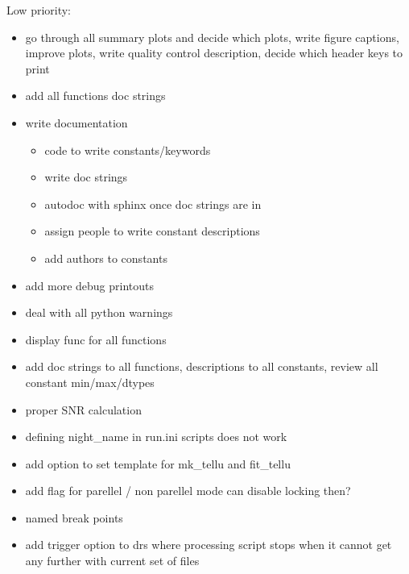 \documentclass[a4paper,10pt,english]{report}
\begin{document}
Low priority:
\begin{itemize}
\item {} 
go through all summary plots and decide which plots, write figure captions, improve plots, write quality control description, decide which header keys to print

\item {} 
add all functions doc strings

\item {} 
write documentation
\begin{itemize}
\item {} 
code to write constants/keywords

\item {} 
write doc strings

\item {} 
autodoc with sphinx once doc strings are in

\item {} 
assign people to write constant descriptions

\item {} 
add authors to constants

\end{itemize}

\item {} 
add more debug printouts

\item {} 
deal with all python warnings

\item {} 
display func for all functions

\item {} 
add doc strings to all functions, descriptions to all constants, review all constant min/max/dtypes

\item {} 
proper SNR calculation

\item {} 
defining night\_name in run.ini scripts does not work

\item {} 
add option to set template for mk\_tellu and fit\_tellu

\item {} 
add flag for parellel / non parellel mode \sphinxhyphen{} can disable locking then?

\item {} 
named break points

\item {} 
add trigger option to drs where processing script stops when it cannot get any further with current set of files

\end{itemize}
\end{document}
